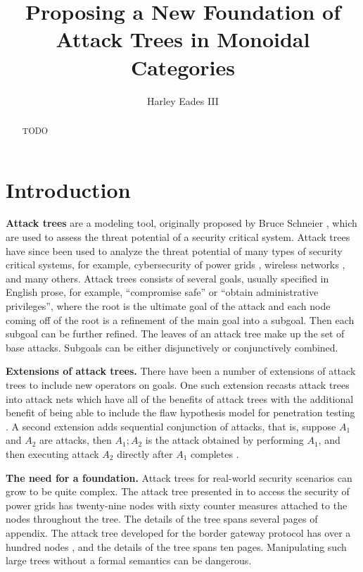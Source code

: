 \documentclass{llncs}
\date{}
\begin{document}
\title{Proposing a New Foundation of Attack Trees in Monoidal Categories}

\author{Harley Eades III}

\maketitle 

\begin{abstract}
  TODO
\end{abstract}

\section{Introduction}
\label{sec:introduction}
\textbf{Attack trees} are a modeling tool, originally proposed by
Bruce Schneier \cite{Schneier:1999}, which are used to assess the
threat potential of a security critical system.  Attack trees have
since been used to analyze the threat potential of many types of
security critical systems, for example, cybersecurity of power grids
\cite{Ten:2007}, wireless networks \cite{Reinhardt:2012}, and many
others.  Attack trees consists of several goals, usually specified in
English prose, for example, ``compromise safe'' or ``obtain
administrative privileges'', where the root is the ultimate goal of
the attack and each node coming off of the root is a refinement of the
main goal into a subgoal.  Then each subgoal can be further refined.
The leaves of an attack tree make up the set of base attacks.  Subgoals
can be either disjunctively or conjunctively combined.

\textbf{Extensions of attack trees.}  There have been a number of
extensions of attack trees to include new operators on goals.  One
such extension recasts attack trees into attack nets which have all of
the benefits of attack trees with the additional benefit of being able
to include the flaw hypothesis model for penetration testing
\cite{McDermott:2001}.  A second extension adds sequential conjunction
of attacks, that is, suppose $A_1$ and $A_2$ are attacks, then
$A_1;A_2$ is the attack obtained by performing $A_1$, and then
executing attack $A_2$ directly after $A_1$ completes
\cite{Jhawar:2015}.

\textbf{The need for a foundation.}  Attack trees for real-world
security scenarios can grow to be quite complex.  The attack tree
presented in \cite{Ten:2007} to access the security of power grids has
twenty-nine nodes with sixty counter measures attached to the nodes
throughout the tree.  The details of the tree spans several pages of
appendix.  The attack tree developed for the border gateway protocol
has over a hundred nodes \cite{Convey:2003}, and the details of the
tree spans ten pages.  Manipulating such large trees without a formal
semantics can be dangerous.
\end{document}
